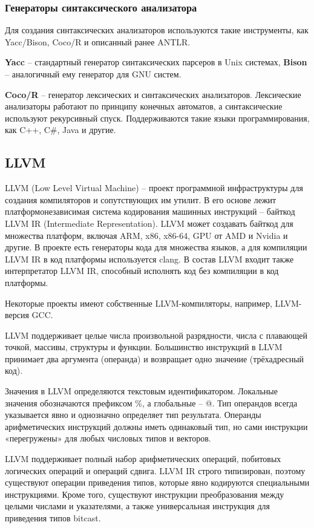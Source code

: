 \subsubsection{Генераторы синтаксического анализатора}
Для создания синтаксических анализаторов используются такие инструменты, как Yacc/Bison, Coco/R и описанный ранее ANTLR.

\textbf{Yacc} -- стандартный генератор синтаксических парсеров в Unix системах, \textbf{Bison} -- аналогичный ему генератор для GNU систем. \cite{bib:bison}

\textbf{Coco/R} -- генератор лексических и синтаксических анализаторов. Лексические анализаторы работают по принципу конечных автоматов, а синтаксические используют рекурсивный спуск. Поддерживаются такие языки программирования, как C++, C\#, Java и другие. \\

\subsection{LLVM}
LLVM (Low Level Virtual Machine) -- проект программной инфраструктуры для создания компиляторов и сопутствующих им утилит. В его основе лежит платформонезависимая система кодирования машинных инструкций -- байткод LLVM IR (Intermediate Representation). LLVM может создавать байткод для множества платформ, включая ARM, x86, x86-64, GPU от AMD и Nvidia и другие. В проекте есть генераторы кода для множества языков, а для компиляции LLVM IR в код платформы используется clang. В состав LLVM  входит также интерпретатор LLVM IR, способный исполнять код без компиляции в код платформы. \cite{bib:llvm}

Некоторые проекты имеют собственные LLVM-компиляторы, например, LLVM-версия GCC.

LLVM поддерживает целые числа произвольной разрядности, числа с плавающей точкой, массивы, структуры и функции. Большинство инструкций в LLVM принимает два аргумента (операнда) и возвращает одно значение (трёхадресный код).

Значения в LLVM определяются текстовым идентификатором. Локальные значения обозначаются префиксом \%, а глобальные – @. Тип операндов всегда указывается явно и однозначно определяет тип результата. Операнды арифметических инструкций должны иметь одинаковый тип, но сами инструкции «перегружены» для любых числовых типов и векторов.

LLVM поддерживает полный набор арифметических операций, побитовых логических операций и операций сдвига. LLVM IR строго типизирован, поэтому существуют
операции приведения типов, которые явно кодируются специальными инструкциями. Кроме того, существуют инструкции преобразования между целыми числами и
указателями, а также универсальная инструкция для приведения типов bitcast.

